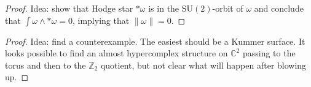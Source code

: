 \begin{proof}
Idea: show that
Hodge star $*\omega$ is in the $\text{SU}(2)$-orbit of $\omega$ and conclude
that $\int \omega\wedge *\omega=0$, implying that $\|\omega\|=0$.
\end{proof}

\begin{exercise}
\label{exercise-closed-fundamental-forms-on-almost-hypercomplex-manifold}

\end{exercise}

\begin{proof}
Idea: find a counterexample. The easiest should be a Kummer surface. It looks
possible to find an almost hypercomplex structure on $\mathbb{C}^2$ passing to
the torus and then to the $\mathbb{Z}_2$ quotient, but not clear what will
happen after blowing up.
\end{proof}





